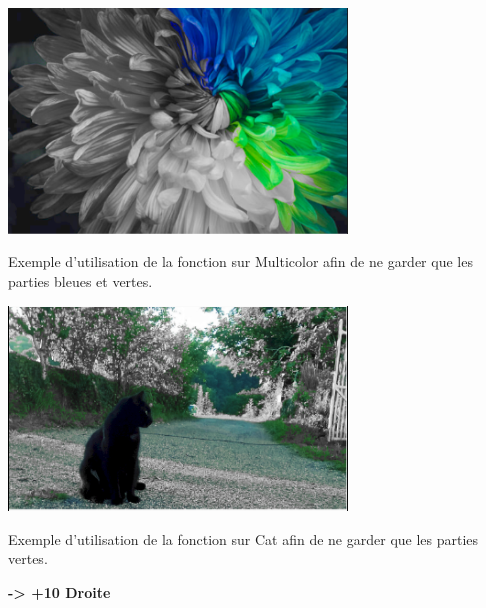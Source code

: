 \documentclass{article}
\begin{document}
\begin{center} 
    \includegraphics[width=9cm]{../Image_fonctions/Multicolor/SelectedColor.PNG}
    
    Exemple d'utilisation de la fonction sur Multicolor afin de ne garder que les parties bleues et vertes.
    
    \includegraphics[width=9cm]{../Image_fonctions/Cat/SelectedColor.PNG}
    
    Exemple d'utilisation de la fonction sur Cat afin de ne garder que les parties vertes.
\end{center}
\bigbreak

\textbf{-> +10 Droite}
\end{document}
